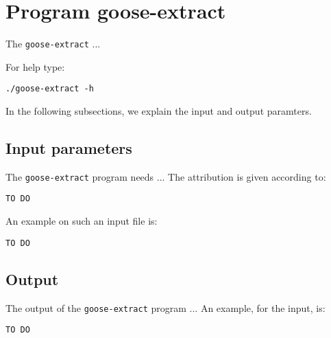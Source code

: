 \section{Program goose-extract}
The \texttt{goose-extract} ...

For help type:
\begin{lstlisting}
./goose-extract -h
\end{lstlisting}
In the following subsections, we explain the input and output paramters.

\subsection{Input parameters}

The \texttt{goose-extract} program needs ...
The attribution is given according to:
\begin{lstlisting}
TO DO
\end{lstlisting}

An example on such an input file is:
\begin{lstlisting}
TO DO
\end{lstlisting}

\subsection{Output}
The output of the \texttt{goose-extract} program ...
An example, for the input, is:
\begin{lstlisting}
TO DO
\end{lstlisting}